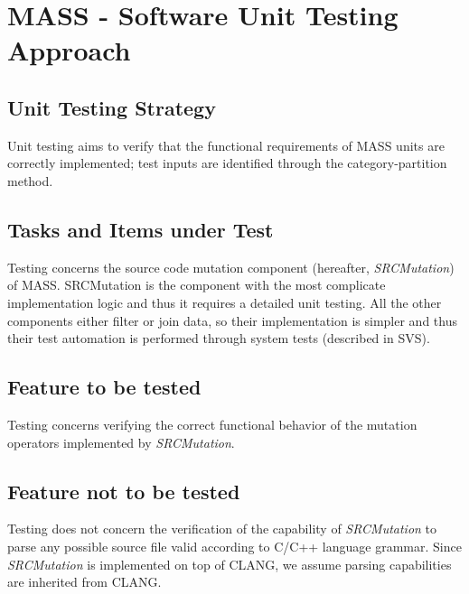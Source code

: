 
\chapter{MASS - Software Unit Testing Approach}


\section{Unit Testing Strategy}


Unit testing aims to verify that the functional requirements of MASS units are correctly implemented; test inputs are identified through the category-partition method.


\section{Tasks and Items under Test}

Testing concerns the source code mutation component (hereafter, \emph{SRCMutation}) of MASS.
SRCMutation is the component with the most complicate implementation logic and thus it requires a detailed unit testing.
All the other components either filter or join data, so their implementation is simpler and thus their test automation is performed through system tests (described in SVS).

\section{Feature to be tested}

Testing concerns verifying the correct functional behavior of the mutation operators implemented by \emph{SRCMutation}.

\section{Feature not to be tested}

Testing does not concern the verification of the capability of \emph{SRCMutation} to parse any possible source file valid according to C/C++ language grammar. Since \emph{SRCMutation} is implemented on top of CLANG, we assume parsing capabilities are inherited from CLANG.



